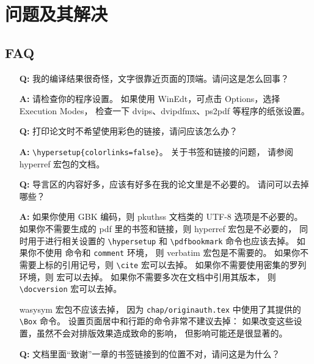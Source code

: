 \chapter{问题及其解决}
	\section{FAQ\label{sec:faq}}
	\begin{enumerate}
		\item[\textbf{Q:}]
		我的编译结果很奇怪，文字很靠近页面的顶端。请问这是怎么回事？

		\item[\textbf{A:}]
		请检查你的程序设置。
		如果使用 WinEdt，可点击 Options，选择 Execution Modes，
		检查一下 dvips、dvipdfmx、ps2pdf 等程序的纸张设置。

		\vspace{1em}
		\item[\textbf{Q:}]
		打印论文时不希望使用彩色的链接，请问应该怎么办？

		\item[\textbf{A:}]
		\verb|\hypersetup{colorlinks=false}|。
		关于书签和链接的问题，
		请参阅 hyperref 宏包的文档\cite{hyperref-doc}。

		\vspace{1em}
		\item[\textbf{Q:}]
		导言区的内容好多，应该有好多在我的论文里是不必要的。
		请问可以去掉哪些？

		\item[\textbf{A:}]
		如果你使用 GBK 编码，则 pkuthss 文档类的 UTF-8 选项是不必要的。
		如果你不需要生成的 pdf 里的书签和链接，则 hyperref 宏包是不必要的，
		同时用于进行相关设置的 %
		\verb|\hypersetup| 和 \verb|\pdfbookmark| 命令也应该去掉。
		如果你不使用 \verb|| 命令和 \verb|comment| 环境，
		则 verbatim 宏包是不需要的。
		如果你不需要上标的引用记号，则 \verb|\cite| 宏可以去掉。
		如果你不需要使用密集的罗列环境，则 \verb|| 宏可以去掉。
		如果你不需要多次在文档中引用其版本，
		则 \verb|\docversion| 宏可以去掉。

		wasysym 宏包不应该去掉，
		因为 \verb|chap/originauth.tex| 中使用了其提供的 \verb|\Box| 命令。
		设置页面居中和行距的命令非常不建议去掉：
		如果改变这些设置，虽然不会对排版效果造成致命的影响，
		但影响可能还是很显著的。

		\vspace{1em}
		\item[\textbf{Q:}]
		文档里面“致谢”一章的书签链接到的位置不对，请问这是为什么？


\end{enumerate}
